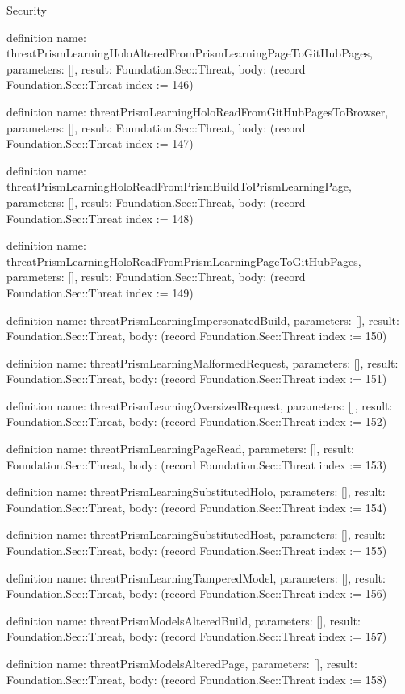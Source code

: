 \begin{lexlean}{Security}
\begin{semanticmodule}
definition{
  name: threatPrismLearningHoloAlteredFromPrismLearningPageToGitHubPages,
  parameters: [],
  result: Foundation.Sec::Threat,
  body: (record Foundation.Sec::Threat {index := 146})
}

definition{
  name: threatPrismLearningHoloReadFromGitHubPagesToBrowser,
  parameters: [],
  result: Foundation.Sec::Threat,
  body: (record Foundation.Sec::Threat {index := 147})
}

definition{
  name: threatPrismLearningHoloReadFromPrismBuildToPrismLearningPage,
  parameters: [],
  result: Foundation.Sec::Threat,
  body: (record Foundation.Sec::Threat {index := 148})
}

definition{
  name: threatPrismLearningHoloReadFromPrismLearningPageToGitHubPages,
  parameters: [],
  result: Foundation.Sec::Threat,
  body: (record Foundation.Sec::Threat {index := 149})
}

definition{
  name: threatPrismLearningImpersonatedBuild,
  parameters: [],
  result: Foundation.Sec::Threat,
  body: (record Foundation.Sec::Threat {index := 150})
}

definition{
  name: threatPrismLearningMalformedRequest,
  parameters: [],
  result: Foundation.Sec::Threat,
  body: (record Foundation.Sec::Threat {index := 151})
}

definition{
  name: threatPrismLearningOversizedRequest,
  parameters: [],
  result: Foundation.Sec::Threat,
  body: (record Foundation.Sec::Threat {index := 152})
}

definition{
  name: threatPrismLearningPageRead,
  parameters: [],
  result: Foundation.Sec::Threat,
  body: (record Foundation.Sec::Threat {index := 153})
}

definition{
  name: threatPrismLearningSubstitutedHolo,
  parameters: [],
  result: Foundation.Sec::Threat,
  body: (record Foundation.Sec::Threat {index := 154})
}

definition{
  name: threatPrismLearningSubstitutedHost,
  parameters: [],
  result: Foundation.Sec::Threat,
  body: (record Foundation.Sec::Threat {index := 155})
}

definition{
  name: threatPrismLearningTamperedModel,
  parameters: [],
  result: Foundation.Sec::Threat,
  body: (record Foundation.Sec::Threat {index := 156})
}

definition{
  name: threatPrismModelsAlteredBuild,
  parameters: [],
  result: Foundation.Sec::Threat,
  body: (record Foundation.Sec::Threat {index := 157})
}

definition{
  name: threatPrismModelsAlteredPage,
  parameters: [],
  result: Foundation.Sec::Threat,
  body: (record Foundation.Sec::Threat {index := 158})
}


\end{semanticmodule}
\end{lexlean}
